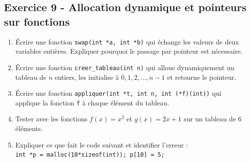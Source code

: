 \documentclass[12pt,a4paper]{article}
\begin{document}
\subsection*{Exercice 9 - Allocation dynamique et pointeurs sur fonctions \niveau{\difficile}}

\begin{boiteexercice}
\begin{enumerate}
  \item Écrire une fonction \texttt{swap(int *a, int *b)} qui échange les valeurs de deux variables entières. Expliquer pourquoi le passage par pointeur est nécessaire.
  \item Écrire une fonction \texttt{creer\_tableau(int n)} qui alloue dynamiquement un tableau de $n$ entiers, les initialise à $0,1,2,\ldots,n-1$ et retourne le pointeur.
  \item Écrire une fonction \texttt{appliquer(int *t, int n, int (*f)(int))} qui applique la fonction \texttt{f} à chaque élément du tableau.
  \item Tester avec les fonctions $f(x)=x^2$ et $g(x)=2x+1$ sur un tableau de 6 éléments.
  \item Expliquer ce que fait le code suivant et identifier l'erreur :\\
  \texttt{int *p = malloc(10*sizeof(int)); p[10] = 5;}
\end{enumerate}
\end{boiteexercice}
\end{document}
